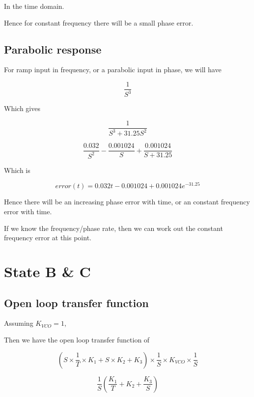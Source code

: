 In the time domain.

Hence for constant frequency there will be a small phase error.

\subsection{Parabolic response}
For ramp input in frequency, or a parabolic input in phase, we will have 

\begin{equation}
\frac{1}{S^3}
\end{equation}

Which gives 

\begin{equation}
\frac{1}{S^3+31.25S^2}
\end{equation}

\begin{equation}
\frac{0.032}{S^2} - \frac{0.001024}{S} + \frac{0.001024}{S+31.25}
\end{equation}

Which is 

\begin{equation}
error(t) =  0.032t - 0.001024 + 0.001024 e^{-31.25}
\end{equation}

Hence there will be an increasing phase error with time, or an constant frequency error with time. 

If we know the frequency/phase rate, then we can work out the constant frequency error at this point.

\section{State B \& C}



\subsection{Open loop transfer function}

Assuming $K_{VCO} = 1$, 

Then we have the open loop transfer function of 

\begin{equation}
(S \times \frac{1}{T} \times K_1 + S \times K_2 +K_3 ) \times \frac{1}{S} \times K_{VCO} \times \frac{1}{S}
\end{equation}


\begin{equation}
\frac{1}{S} (\frac{K_1}{T} + K_2 +  \frac{K_3}{S})
\end{equation}

